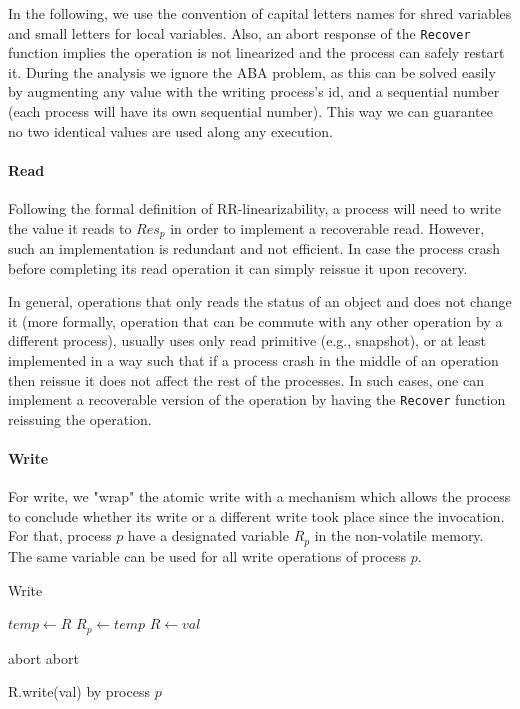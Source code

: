 In the following, we use the convention of capital letters names for shred variables and small letters for local variables. Also, an abort response of the \texttt{Recover} function implies the operation is not linearized and the process can safely restart it. During the analysis we ignore the ABA problem, as this can be solved easily by augmenting any value with the writing process's id, and a sequential number (each process will have its own sequential number). This way we can guarantee no two identical values are used along any execution.

\paragraph*{Read}

Following the formal definition of RR-linearizability, a process will need to write the value it reads to $Res_p$ in order to implement a recoverable read. However, such an implementation is redundant and not efficient. In case the process crash before completing its read operation it can simply reissue it upon recovery.

In general, operations that only reads the status of an object and does not change it (more formally, operation that can be commute with any other operation by a different process), usually uses only read primitive (e.g., snapshot), or at least implemented in a way such that if a process crash in the middle of an operation then reissue it does not affect the rest of the processes. In such cases, one can implement a recoverable version of the operation by having the \texttt{Recover} function reissuing the operation.

\paragraph*{Write}
For write, we "wrap" the atomic write with a mechanism which allows the process to conclude whether its write or a different write took place since the invocation. For that, process $p$ have a designated variable $R_p$ in the non-volatile memory. The same variable can be used for all write operations of process $p$.

\begin{algorithm}
	\caption{Write}\label{recoverable write}
	\begin{algorithmic}[1]	
		\State $temp \gets R$
		\State $R_p \gets temp$
		\State $R \gets val$
		\EndProcedure
		
		 \Return abort
		\EndIf
		 \Return abort
		\EndIf
		\EndProcedure
	\end{algorithmic}
	\caption{R.write(val) by process $p$}
\end{algorithm}

